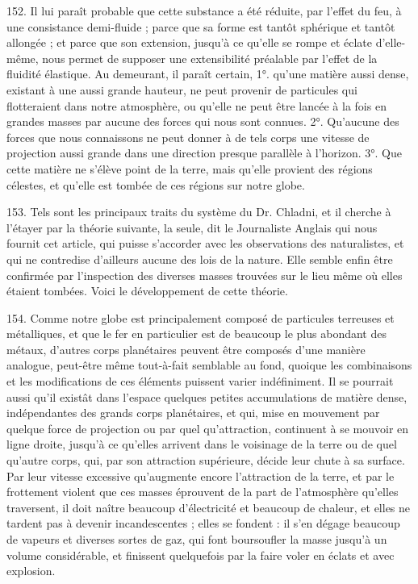 \documentclass[a4paper, 11pt, oneside, polutonikogreek, french]{article}
\begin{document}
152. \og Il lui paraît probable que cette substance a été réduite, par l'effet du feu, à une consistance demi-fluide ; parce que sa forme est tantôt sphérique et tantôt allongée ; et parce que son extension, jusqu'à ce qu'elle se rompe et éclate d'elle-même, nous permet de supposer une extensibilité préalable par l'effet de la fluidité élastique. Au demeurant, il paraît certain, 1°. qu'une matière aussi dense, existant à une aussi grande hauteur, ne peut provenir de particules qui flotteraient dans notre atmosphère, ou qu'elle ne peut être lancée à la fois en grandes masses par aucune des forces qui nous sont connues. 2°. Qu'aucune des forces que nous connaissons ne peut donner à de tels corps une vitesse de projection aussi grande dans une direction presque parallèle à l'horizon. 3°. Que cette matière ne s'élève point de la terre, mais qu'elle provient des régions célestes, et qu'elle est tombée de ces régions sur notre globe. \fg

153. Tels sont les principaux traits du système du Dr. Chladni, et il cherche à l'étayer par la théorie suivante, la seule, dit le Journaliste Anglais qui nous fournit cet article, qui puisse s'accorder avec les observations des naturalistes, et qui ne contredise d'ailleurs aucune des lois de la nature. Elle semble enfin être confirmée par l'inspection des diverses masses trouvées sur le lieu même où elles étaient tombées. Voici le développement de cette théorie.

154. \og Comme notre globe est principalement composé de particules terreuses et métalliques, et que le fer en particulier est de beaucoup le plus abondant des métaux, d'autres corps planétaires peuvent être composés d'une manière analogue, peut-être même tout-à-fait semblable au fond, quoique les combinaisons et les modifications de ces éléments puissent varier indéfiniment. Il se pourrait aussi qu'il existât dans l'espace quelques petites accumulations de matière dense, indépendantes des grands corps planétaires, et qui, mise en mouvement par quelque force de projection ou par quel qu’attraction, continuent à se mouvoir en ligne droite, jusqu'à ce qu'elles arrivent dans le voisinage de la terre ou de quel qu’autre corps, qui, par son attraction supérieure, décide leur chute à sa surface. Par leur vitesse excessive qu'augmente encore l'attraction de la terre, et par le frottement violent que ces masses éprouvent de la part de l'atmosphère qu'elles traversent, il doit naître beaucoup d'électricité et beaucoup de chaleur, et elles ne tardent pas à devenir incandescentes ; elles se fondent : il s'en dégage beaucoup de vapeurs et diverses sortes de gaz, qui font boursoufler la masse jusqu'à un volume considérable, et finissent quelquefois par la faire voler en éclats et avec explosion. \fg
\end{document}
